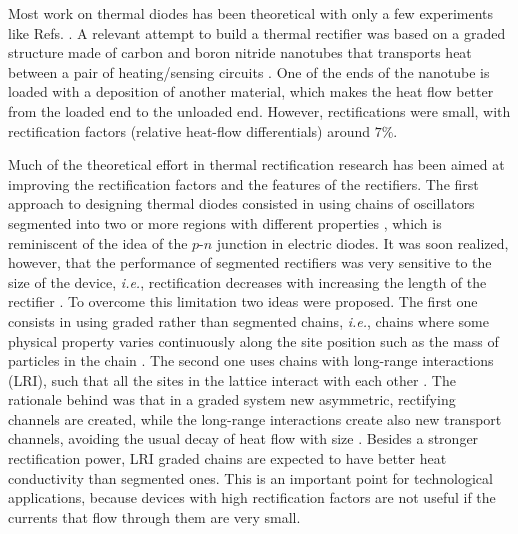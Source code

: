 Most work on thermal diodes has been theoretical with only a few experiments
like Refs. \cite{Chang2006,Kobayashi2009,Leitner2013,Elzouka2017}.
A relevant attempt to build a thermal rectifier was based on a graded structure made of carbon and boron nitride nanotubes that transports heat between a pair of heating/sensing circuits \cite{Chang2006}. One of the ends of the nanotube is loaded with a deposition of another material, which makes the heat flow better from the loaded end to the unloaded end. However, rectifications were small, with rectification factors (relative
heat-flow differentials) around $7\%$.

Much of the theoretical effort in thermal rectification research has been aimed at improving the rectification factors and the features of the rectifiers. The first approach to designing thermal diodes consisted in using chains of oscillators segmented into two or more regions with different properties \cite{Terraneo2002,Li2004,Li2008,Hu2006}, which is reminiscent of the idea of the $p$-$n$ junction in electric diodes. It was soon realized, however, that the performance of segmented rectifiers was very sensitive to the size of the device, \textit{i.e.}, rectification decreases with increasing the length of the rectifier \cite{Hu2006}. To overcome this limitation two ideas were proposed. The first one consists in using graded rather than segmented chains, \textit{i.e.}, chains where some physical property varies continuously along the site position such as the mass of particles in the chain \cite{Wang2012,Chen2015,Romero-Bastida2017,Yang2007,Romero-Bastida2013,Dettori2016,Pereira2010,Pereira2011,Avila2013}. The second one uses chains with long-range interactions (LRI), such that all the sites in the lattice interact with each other \cite{Chen2015,Bagchi2017,Pereira2013}. The rationale behind was that in a graded system new asymmetric, rectifying channels are created, while the long-range interactions create
also new transport channels, avoiding the usual decay of heat flow with size \cite{Chen2015}. Besides a stronger rectification power, LRI graded chains are expected to have better heat conductivity than segmented ones. This is an important point for technological applications, because devices with high rectification factors are not useful if the currents that flow through them are very small.

